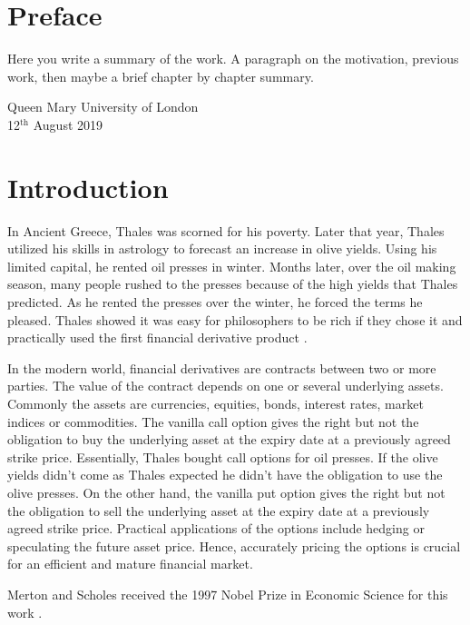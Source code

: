 \documentclass[12pt, oneside]{book}
\theoremstyle{plain}
\theoremstyle{definition}
\begin{document}
\chapter*{Preface}
Here  you write a summary of the work. A paragraph on the motivation, previous work, then maybe a brief chapter by chapter summary. 

\lipsum[100]%

\begin{flushright}
Queen Mary University of London\\
12${}^{\text{th}}$ August 2019
\end{flushright}

\tableofcontents

\chapter{Introduction}
In Ancient Greece, Thales was scorned for his poverty. Later that year, Thales utilized his skills in astrology to forecast an increase in olive yields. Using his limited capital, he rented oil presses in winter. Months later, over the oil making season, many people rushed to the presses because of the high yields that Thales predicted. As he rented the presses over the winter, he forced the terms he pleased. Thales showed it was easy for philosophers to be rich if they chose it and practically used the first  financial derivative product \cite{thalesians}. 

In the modern world, financial derivatives are contracts between two or more parties. The value of the contract depends on one or several underlying assets. Commonly the assets are currencies, equities, bonds, interest rates, market indices or commodities. The vanilla call option gives the right but not the obligation to buy the underlying asset at the expiry date at a previously agreed strike price. Essentially, Thales bought call options for oil presses.  If the olive yields didn't come as Thales expected he didn't have the obligation to use the olive presses.  On the other hand, the vanilla put option gives the right but not the obligation to sell the underlying asset at the expiry date at a previously agreed strike price. Practical applications of the options include hedging or speculating the future asset price. Hence, accurately pricing the options is crucial for an efficient and mature financial market.

Merton and Scholes received the 1997 Nobel Prize in Economic Science for this work \cite{merton}. 
\end{document}
